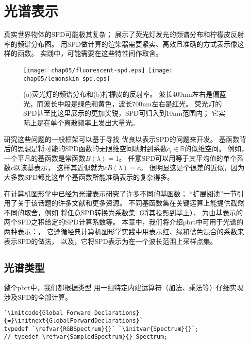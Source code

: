 \section{光谱表示}\label{sec:光谱表示}

真实世界物体的SPD可能极其复杂；
展示了荧光灯发光的频谱分布和柠檬皮反射率的频谱分布图。
用SPD做计算的渲染器需要紧实、高效且准确的方式表示像这样的函数。
实践中，可能需要在这些特性间作取舍。
\begin{figure}[htbp]
    \centering
    \texttt{[image: chap05/fluorescent-spd.eps]}\,\nolinebreak
    \texttt{[image: chap05/lemonskin-spd.eps]}
    \caption{(a)荧光灯的频谱分布和(b)柠檬皮的反射率。
    波长400nm左右是偏蓝光，而波长中段是绿色和黄色，波长700nm左右是红光。
    荧光灯的SPD甚至比这里展示的更加尖锐，SPD可归入到10nm范围内；
    它实际上是在单个离散频率上发出大量光。}
    \label{fig:5.1}
\end{figure}

研究这些问题的一般框架可以基于寻找
优良以表示SPD的问题来开发。
基函数背后的思想是将可能的SPD函数的无限维空间映射到系数$c_i\in\mathbb{R}$的低维空间。
例如，一个平凡的基函数是常函数$B(\lambda)=1$。
任意SPD可以用等于其平均值的单个系数$c$以该基表示，
这样其近似就为$cB(\lambda)=c$。
很明显这是个很差的近似，因为大多数SPD都比这单个基函数所能准确表示的复杂得多。

在计算机图形学中已经为光谱表示研究了许多不同的基函数；
“扩展阅读”一节引用了关于该话题的许多文献和更多资源。
不同基函数集在关键运算上能提供截然不同的取舍，例如
将任意SPD转换为系数集（将其投影到基上）、
为由基表示的两个SPD之积给定的SPD计算系数等。
本章中，我们将介绍pbrt中可用于光谱的两种表示：，
它遵循经典计算机图形学实践中用表示红、绿和蓝色混合的系数来表示SPD的做法，
以及，它将SPD表示为在一个波长范围上采样点集。

\subsection{光谱类型}\label{sub:光谱类型}
整个pbrt中，我们都根据类型
用一组特定内建运算符（加法、乘法等）仔细实现涉及SPD的全部计算。

\begin{lstlisting}
`\initcode{Global Forward Declarations}{=}\initnext{GlobalForwardDeclarations}`
typedef `\refvar{RGBSpectrum}{}` `\initvar{Spectrum}{}`;
// typedef \refvar{SampledSpectrum}{} Spectrum;
\end{lstlisting}

